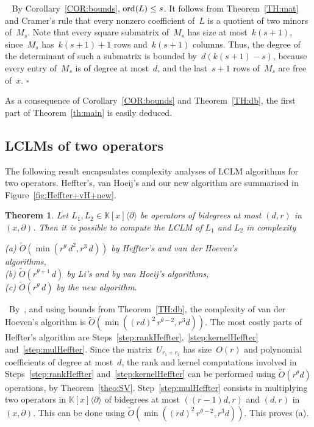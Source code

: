 \documentclass{sig-alt-full}
\def\myproof{\noindent{\sc Proof.}~}
\def\foorp{\hfill$\square$}
\def\K {\ensuremath{\mathbb{K}}}
\newcommand{\x}{x}
\newcommand{\Dx}{\partial}
\newcommand{\ord} { {\rm ord}}
\newcommand{\bigOsoft}{\widetilde{{O}}}
\newtheorem{theorem}{Theorem}
\begin{document}
\myproof
By Corollary~\ref{COR:bounds}, $\ord(L) \le s$. It follows from Theorem~\ref{TH:mat}
and Cramer's rule
that every nonzero coefficient of~$L$ is a quotient of two 
minors of~$M_s$. Note that every square submatrix of~$M_s$ has size at
most~$k(s+1)$, since~$M_s$ has~$k(s+1)+1$ rows and~$k(s+1)$ columns. Thus, the
degree of the determinant of such a submatrix is bounded by~$d(k(s+1)-s)$,
because every entry of~$M_s$ is of degree at most~$d$, and the
last~$s+1$ rows of~$M_s$ are free of~$x$. \foorp

As a consequence of Corollary~\ref{COR:bounds} and Theorem~\ref{TH:db}, 
the first part of Theorem~\ref{th:main} is easily deduced.

\subsection{LCLMs of two operators}
The following result encapsulates complexity analyses of LCLM algorithms for two operators. Heffter's, van Hoeij's and our new algorithm are summarised in Figure~\ref{fig:Heffter+vH+new}.

\begin{theorem}\label{theo:compl-2ops}
Let $L_1, L_2 \in \K[\x]\langle
\Dx\rangle$ be operators of bidegrees at most $(d,r)$ in $(x,\Dx)$.	
Then it is possible to compute the LCLM of $L_1$ and $L_2$ in complexity
\begin{tabbing}
	\quad \emph{(a)} $\bigOsoft(\min(r^\theta \, d^2, r^3 \, d))$ by Heffter's and van der Hoeven's \\ algorithms,\\
	\quad \emph{(b)} $\bigOsoft(r^{\theta+1} \, d)$ by Li's and by van Hoeij's algorithms,\\
	\quad \emph{(c)} $\bigOsoft(r^{\theta} \, d)$ by the new algorithm.
\end{tabbing}
\end{theorem}

\myproof By~\cite[Theorems~5,~8 \& 23]{VdHoeven11}, and using bounds from
Theorem~\ref{TH:db}, the complexity of van der Hoeven's algorithm is
$\bigOsoft(\min((rd)^2 \, r^{\theta-2}, r^3d))$.
The most costly parts of Heffter's algorithm are
Steps~\ref{step:rankHeffter},~\ref{step:kernelHeffter}
and~\ref{step:mulHeffter}. Since the matrix~$U_{r_1+r_2}$ has size~$O(r)$ and polynomial coefficients of degree at most~$d$, the rank and kernel computations involved in Steps~\ref{step:rankHeffter} and~\ref{step:kernelHeffter} can be performed using $\bigOsoft(r^\theta d)$ operations, by Theorem~\ref{theo:SV}. Step~\ref{step:mulHeffter} consists in 
multiplying two operators in $\K[\x]\langle \Dx\rangle$ of bidegrees at most $((r-1)d,r)$ and $(d,r)$ in $(x,\partial)$. This can be done using
$\bigOsoft(\min((rd)^2 \, r^{\theta-2}, r^3d))$. This proves (a). 
\end{document}
